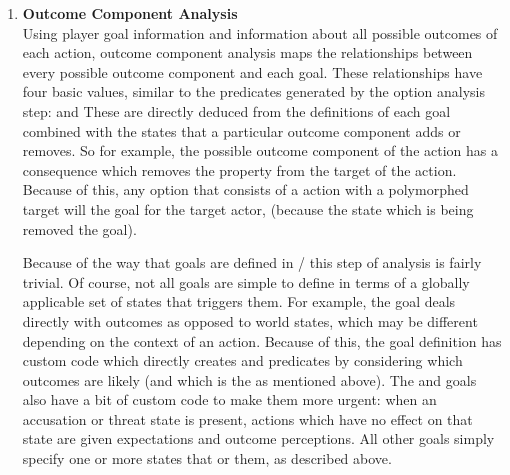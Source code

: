\begin{enumerate}
  \item %
    \textbf{Outcome Component Analysis} \\
    Using player goal information and information about all possible outcomes of each action, outcome component analysis maps the relationships between every possible outcome component and each goal.
  These relationships have four basic values, similar to the  predicates generated by the option analysis step:    and 
    These are directly deduced from the definitions of each goal combined with the states that a particular outcome component adds or removes.
    So for example, the  possible outcome component of the  action has a consequence which removes the  property from the target of the action.
    Because of this, any option that consists of a  action with a polymorphed target will  the  goal for the target actor, (because the  state which is being removed  the  goal).

    Because of the way that goals are defined in \dunyazad/ this step of analysis is fairly trivial.
    Of course, not all goals are simple to define in terms of a globally applicable set of states that triggers them.
    For example, the  goal deals directly with outcomes as opposed to world states, which may be different depending on the context of an action.
    Because of this, the  goal definition has custom code which directly creates  and  predicates by considering which outcomes are likely (and which is the  as mentioned above).
    The  and  goals also have a bit of custom code to make them more urgent: when an accusation or threat state is present, actions which have no effect on that state are given  expectations and  outcome perceptions.
    All other goals simply specify one or more states that    or  them, as described above.


\end{enumerate}
